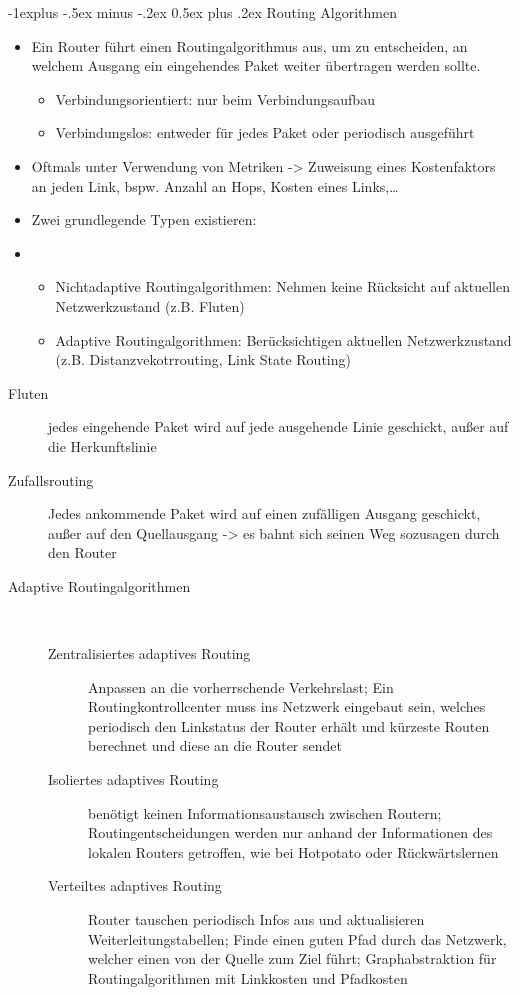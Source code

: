 \documentclass[10pt,landscape]{article}
\makeatletter
\renewcommand{\subsection}{\@startsection{subsection}{2}{0mm}%
                                {-1explus -.5ex minus -.2ex}%
                                {0.5ex plus .2ex}%
                                {\normalfont\normalsize\bfseries}}
\makeatother
\begin{document}
\begin{multicols}{3}
\subsection{Routing Algorithmen}
\begin{itemize}
    \item Ein Router führt einen Routingalgorithmus aus, um zu entscheiden, an welchem Ausgang ein eingehendes Paket weiter übertragen werden sollte.
    \begin{itemize}
        \item Verbindungsorientiert: nur beim Verbindungsaufbau
        \item Verbindungslos: entweder für jedes Paket oder periodisch ausgeführt
    \end{itemize}
    \item Oftmals unter Verwendung von Metriken -> Zuweisung eines Kostenfaktors an jeden Link, bspw. Anzahl an Hops, Kosten eines Links,…
    \item Zwei grundlegende Typen existieren:
    \item \begin{itemize}
        \item Nichtadaptive Routingalgorithmen: Nehmen keine Rücksicht auf aktuellen Netzwerkzustand (z.B. Fluten)
        \item Adaptive Routingalgorithmen: Berücksichtigen aktuellen Netzwerkzustand (z.B. Distanzvekotrrouting, Link State Routing)
    \end{itemize}
\end{itemize}
\begin{description}
    \item[Fluten] jedes eingehende Paket wird auf jede ausgehende Linie geschickt, außer auf die Herkunftslinie
    \item[Zufallsrouting] Jedes ankommende Paket wird auf einen zufälligen Ausgang geschickt, außer auf den Quellausgang -> es bahnt sich seinen Weg sozusagen durch den Router
    \item[Adaptive Routingalgorithmen] \
        \begin{description}
            \item[Zentralisiertes adaptives Routing] Anpassen an die vorherrschende Verkehrslast; Ein Routingkontrollcenter muss ins Netzwerk eingebaut sein, welches periodisch den Linkstatus der Router erhält und kürzeste Routen berechnet und diese an die Router sendet
            \item[Isoliertes adaptives Routing] benötigt keinen Informationsaustausch zwischen Routern; Routingentscheidungen werden nur anhand der Informationen des lokalen Routers getroffen, wie bei Hotpotato oder Rückwärtslernen
            \item[Verteiltes adaptives Routing] Router tauschen periodisch Infos aus und aktualisieren Weiterleitungstabellen; Finde einen guten Pfad durch das Netzwerk, welcher einen von der Quelle zum Ziel führt; Graphabstraktion für Routingalgorithmen mit Linkkosten und Pfadkosten
        \end{description} 
\end{description}


\end{multicols}
\end{document}
